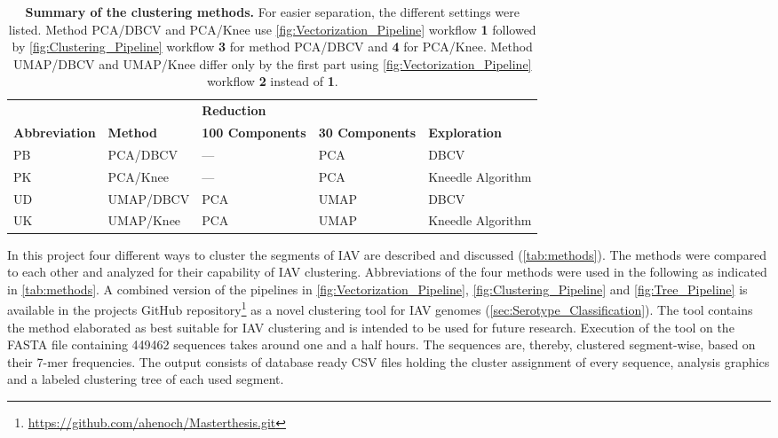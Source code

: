 \begin{table}[!hbt]
    \footnotesize
    \centering
    \caption[Summary of the clustering methods]{\textbf{Summary of the clustering methods.} For easier separation, the different settings were listed. Method PCA/DBCV and PCA/Knee use \autoref{fig:Vectorization_Pipeline} workflow \textsf{\textbf{1}} followed by \autoref{fig:Clustering_Pipeline} workflow \textsf{\textbf{3}} for method PCA/DBCV and \textsf{\textbf{4}} for PCA/Knee. Method UMAP/DBCV and UMAP/Knee differ only by the first part using \autoref{fig:Vectorization_Pipeline} workflow \textsf{\textbf{2}} instead of \textsf{\textbf{1}}.}
    \label{tab:methods}
    \begin{tabular*}{\textwidth}{@{\extracolsep{\fill}\hspace{6pt}}lllll}
        \toprule
        & & \multicolumn{2}{l}{\textbf{Reduction}} & \\
        \cmidrule(lr){3-4}
        \textbf{Abbreviation} & \textbf{Method} & \textbf{100 Components} & \textbf{30 Components} & \textbf{Exploration}\\
        \midrule
        PB & PCA/DBCV & --- & PCA & DBCV\\
        PK & PCA/Knee & --- & PCA & Kneedle Algorithm\\
        UD & UMAP/DBCV & PCA & UMAP & DBCV\\
        UK & UMAP/Knee & PCA & UMAP & Kneedle Algorithm\\
        \bottomrule
    \end{tabular*}
\end{table}

In this project four different ways to cluster the segments of \gls{IAV} are described and discussed (\autoref{tab:methods}). The methods were compared to each other and analyzed for their capability of \gls{IAV} clustering. Abbreviations of the four methods were used in the following as indicated in \autoref{tab:methods}. A combined version of the pipelines in \autoref{fig:Vectorization_Pipeline}, \autoref{fig:Clustering_Pipeline} and \autoref{fig:Tree_Pipeline} is available in the projects GitHub repository\footnote{\url{https://github.com/ahenoch/Masterthesis.git}} as a novel clustering tool for \gls{IAV} genomes (\autoref{sec:Serotype_Classification}). The tool contains the method elaborated as best suitable for \gls{IAV} clustering and is intended to be used for future research. Execution of the tool on the FASTA file containing 449462 sequences takes around one and a half hours. The sequences are, thereby, clustered segment-wise, based on their 7-mer frequencies. The output consists of database ready CSV files holding the cluster assignment of every sequence, analysis graphics and a labeled clustering tree of each used segment. 


